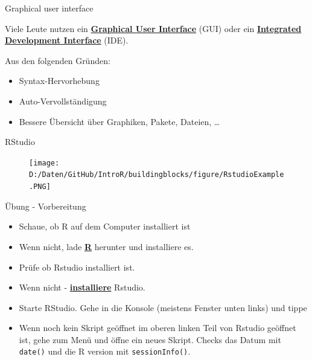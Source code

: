\documentclass[ignorenonframetext,]{beamer}
\providecommand{\tightlist}{%
  \setlength{\itemsep}{0pt}\setlength{\parskip}{0pt}}
\begin{document}
\begin{frame}{Graphical user interface}

Viele Leute nutzen ein
\href{https://en.wikipedia.org/wiki/Graphical_user_interface}{\textbf{Graphical
User Interface}} (GUI) oder ein
\href{https://en.wikipedia.org/wiki/Integrated_development_environment}{\textbf{Integrated
Development Interface}} (IDE).

Aus den folgenden Gründen:

\begin{itemize}
\tightlist
\item
  Syntax-Hervorhebung
\item
  Auto-Vervollständigung
\item
  Bessere Übersicht über Graphiken, Pakete, Dateien, \ldots{}
\end{itemize}

\end{frame}

\begin{frame}{RStudio}

\begin{figure}
\centering
\texttt{[image: D:/Daten/GitHub/IntroR/buildingblocks/figure/RstudioExample.PNG]}
\caption{}
\end{figure}

\end{frame}

\begin{frame}[fragile]{Übung - Vorbereitung}

\begin{itemize}
\item
  Schaue, ob R auf dem Computer installiert ist
\item
  Wenn nicht, lade \href{r-project.org}{\textbf{R}} herunter und
  installiere es.
\item
  Prüfe ob Rstudio installiert ist.
\item
  Wenn nicht - \href{http://www.rstudio.com/}{\textbf{installiere}}
  Rstudio.
\item
  Starte RStudio. Gehe in die Konsole (meistens Fenster unten links) und
  tippe
\item
  Wenn noch kein Skript geöffnet im oberen linken Teil von Rstudio
  geöffnet ist, gehe zum Menü und öffne ein neues Skript. Checks das
  Datum mit \texttt{date()} und die R version mit
  \texttt{sessionInfo()}.
\end{itemize}

\end{frame}
\end{document}

